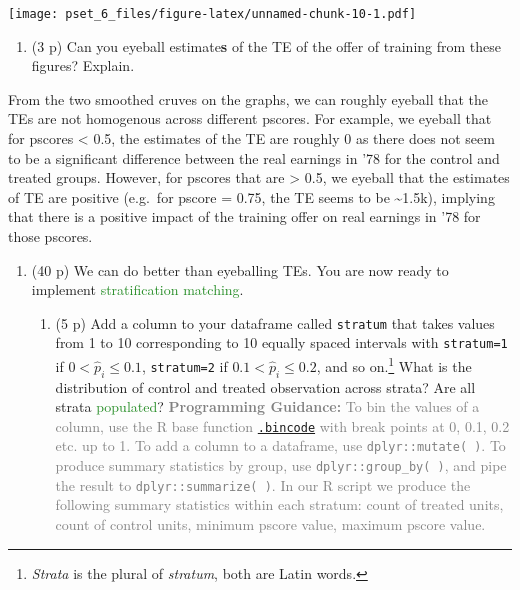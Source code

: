 \documentclass[
]{article}
\providecommand{\tightlist}{%
  \setlength{\itemsep}{0pt}\setlength{\parskip}{0pt}}
\begin{document}
\texttt{[image: pset\_6\_files/figure-latex/unnamed-chunk-10-1.pdf]}

\begin{enumerate}
\def\labelenumi{\alph{enumi}.}
\setcounter{enumi}{1}
\tightlist
\item
  (3 p) Can you eyeball estimate\textbf{s} of the TE of the offer of
  training from these figures? Explain.
\end{enumerate}

From the two smoothed cruves on the graphs, we can roughly eyeball that
the TEs are not homogenous across different pscores. For example, we
eyeball that for pscores \textless{} 0.5, the estimates of the TE are
roughly 0 as there does not seem to be a significant difference between
the real earnings in '78 for the control and treated groups. However,
for pscores that are \textgreater{} 0.5, we eyeball that the estimates
of TE are positive (e.g.~for pscore = 0.75, the TE seems to be
\textasciitilde1.5k), implying that there is a positive impact of the
training offer on real earnings in '78 for those pscores.

\begin{enumerate}
\def\labelenumi{\arabic{enumi}.}
\setcounter{enumi}{2}
\item
  (40 p) We can do better than eyeballing TEs. You are now ready to
  implement \textcolor{ForestGreen}{stratification matching}.

  \begin{enumerate}
  \def\labelenumii{\alph{enumii}.}
  \tightlist
  \item
    (5 p) Add a column to your dataframe called \texttt{stratum} that
    takes values from 1 to 10 corresponding to 10 equally spaced
    intervals with \texttt{stratum=1} if \(0<\widehat{p}_{i}\leq 0.1\),
    \texttt{stratum=2} if \(0.1<\widehat{p}_{i}\leq 0.2\), and so
    on.\footnote{\textit{Strata} is the plural of \textit{stratum}, both are Latin words.}
    What is the distribution of control and treated observation across
    strata? Are all strata \textcolor{ForestGreen}{populated}?
    \textcolor{gray}{\textbf{Programming Guidance:} To bin the values of a column, use the R base function \href{https://www.rdocumentation.org/packages/base/versions/3.6.2/topics/.bincode( )}{\texttt{.bincode}} with break points at 0, 0.1, 0.2 etc. up to 1. To add a column to a dataframe, use \texttt{dplyr::mutate( )}. To produce summary statistics by group, use \texttt{dplyr::group\_by( )}, and pipe the result to \texttt{dplyr::summarize( )}. In our R script we produce the following summary statistics within each stratum: count of treated units, count of control units, minimum pscore value, maximum pscore value.}
  \end{enumerate}
\end{enumerate}
\end{document}
